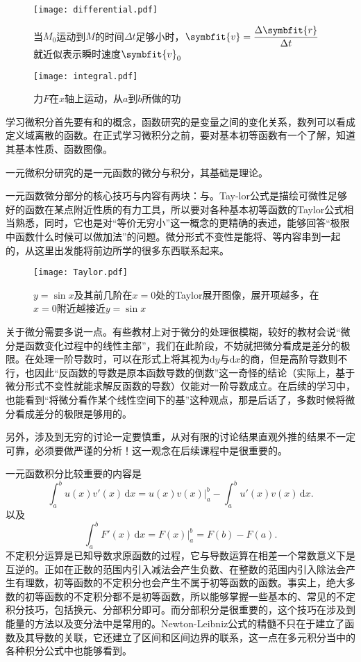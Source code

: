 \begin{figure}
    \centering
    \texttt{[image: differential.pdf]}
    \caption{当$M_0$运动到$M$的时间$\Delta t$足够小时，$\symbfit{v}=\dfrac{\Delta \symbfit{r}}{\Delta t}$就近似表示瞬时速度$\symbfit{v}_0$}
\end{figure}

\begin{figure}
    \centering
    \texttt{[image: integral.pdf]}
    \caption{力$F$在$x$轴上运动，从$a$到$b$所做的功}
\end{figure}

学习微积分首先要有和的概念，函数研究的是变量之间的变化关系，数列可以看成定义域离散的函数。在正式学习微积分之前，要对基本初等函数有一个了解，知道其基本性质、函数图像。

一元微积分研究的是一元函数的微分与积分，其基础是理论。

一元函数微分部分的核心技巧与内容有两块：与。Tay-lor公式是描绘可微性足够好的函数在某点附近性质的有力工具，所以要对各种基本初等函数的Taylor公式相当熟悉，同时，它也是对“等价无穷小”这一概念的更精确的表述，能够回答“极限中函数什么时候可以做加法”的问题。微分形式不变性是能将、等内容串到一起的，从这里出发能将前边所学的很多东西联系起来。

\begin{figure}
    \centering
    \texttt{[image: Taylor.pdf]}
    \caption{$y=\sin x$及其前几阶在$x=0$处的Taylor展开图像，展开项越多，在$x=0$附近越接近$y=\sin x$}
\end{figure}

关于微分需要多说一点。有些教材上对于微分的处理很模糊，较好的教材会说“微分是函数变化过程中的线性主部”，我们在此阶段，不妨就把微分看成是差分的极限。在处理一阶导数时，可以在形式上将其视为$\mathrm{d}y$与$\mathrm{d}x$的商，但是高阶导数则不行，也因此“反函数的导数是原本函数导数的倒数”这一奇怪的结论（实际上，基于微分形式不变性就能求解反函数的导数）仅能对一阶导数成立。在后续的学习中，也能看到“将微分看作某个线性空间下的基”这种观点，那是后话了，多数时候将微分看成差分的极限是够用的。

另外，涉及到无穷的讨论一定要慎重，从对有限的讨论结果直观外推的结果不一定可靠，必须要做严谨的分析！这一观念在后续课程中是很重要的。

一元函数积分比较重要的内容是
\[
    \int_{a}^{b} u(x)v'(x)\,\mathrm{d}x = u(x)v(x)\bigg|_a^{b} - \int_{a}^{b} u'(x)v(x)\,\mathrm{d}x
    .\]
以及
\[
    \int_{a}^{b} F'(x)\,\mathrm{d}x = F(x)\bigg|_a^{b} = F(b)-F(a)
    .\]
不定积分运算是已知导数求原函数的过程，它与导数运算在相差一个常数意义下是互逆的。正如在正数的范围内引入减法会产生负数、在整数的范围内引入除法会产生有理数，初等函数的不定积分也会产生不属于初等函数的函数。事实上，绝大多数的初等函数的不定积分都不是初等函数，所以能够掌握一些基本的、常见的不定积分技巧，包括换元、分部积分即可。而分部积分是很重要的，这个技巧在涉及到能量的方法以及变分法中是常用的。Newton-Leibniz公式的精髓不只在于建立了函数及其导数的关联，它还建立了区间和区间边界的联系，这一点在多元积分当中的各种积分公式中也能够看到。


